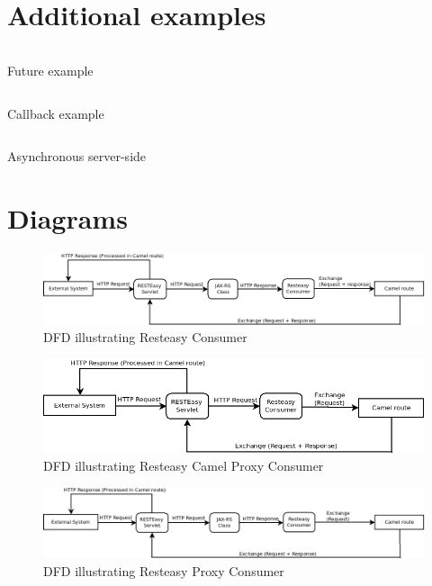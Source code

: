 \documentclass[12pt,final,oneside]{fithesis2}
\begin{document}
\newpage
\section{Additional examples}
\begin{listing}[ht]
	\inputminted[]{java}{sources/future.java}
	\caption{Future example}
	\label{future}
\end{listing}
\begin{listing}[H]
	\inputminted[]{java}{sources/callbackClient.java}
	\caption{Callback example}
	\label{callbackClient}
\end{listing}


\begin{listing}[H]
	\inputminted[]{java}{sources/asyncServer.java}
	\caption{Asynchronous server-side}
	\label{async-server}
\end{listing}


\newpage
\clearpage

\section{Diagrams}
\begin{figure}[H]
\includegraphics[width=1.1\linewidth]{diagrams/basic.png}
\caption{DFD illustrating Resteasy Consumer}
\label{dfd-basic}
\end{figure}


\begin{figure}[H]
\includegraphics[width=1.0\linewidth]{diagrams/camelProxy.png}
\caption{DFD illustrating Resteasy Camel Proxy Consumer}
\label{dfd-camel}
\end{figure}


\begin{figure}[H]
\includegraphics[width=1.1\linewidth]{diagrams/proxy.png}
\caption{DFD illustrating Resteasy Proxy Consumer}
\label{dfd-proxy}
\end{figure}
\end{document}
